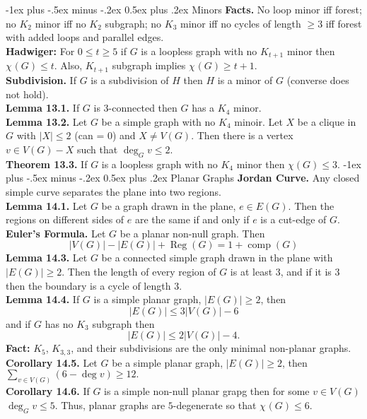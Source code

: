 \documentclass[10pt,landscape]{article}
\makeatletter
\renewcommand{\section}{\@startsection{section}{1}{0mm}%
                                {-1ex plus -.5ex minus -.2ex}%
                                {0.5ex plus .2ex}%
                                {\normalfont\large\bfseries}}
\makeatother
\begin{document}
\begin{multicols}{3}
\section{Minors}
\textbf{Facts.} No loop minor iff forest; no \( K_2 \) minor iff no \( K_2 \) subgraph; no \( K_3 \) minor iff no cycles of length \( \geq 3 \) iff forest with added loops and parallel edges. \\
\textbf{Hadwiger:} For \( 0 \leq t \geq 5 \) if \( G \) is a loopless graph with no \( K_{t+1}  \) minor then \( \chi_{} (G) \leq t \). Also, \( K_{t+1}  \) subgraph implies \( \chi_{} (G) \geq t + 1 \). \\
\textbf{Subdivision.} If \( G \) is a subdivision of \( H \) then \( H \) is a minor of \( G \) (converse does not hold). \\
\textbf{Lemma 13.1.} If \( G \) is 3-connected then \( G \) has a \( K_4 \) minor. \\
\textbf{Lemma 13.2.} Let \( G \) be a simple graph with no \( K_4 \) minoir. Let \( X \) be a clique in \( G \) with \( |X| \leq 2 \) (can = 0) and \( X \neq V(G) \). Then there is a vertex \( v \in V(G) - X \) such that \( \deg _{G} v \leq 2 \). \\
\textbf{Theorem 13.3.} If \( G \) is a loopless graph with no \( K_4 \) minor then \( \chi(G) \leq 3 \).
\section{Planar Graphs}
\textbf{Jordan Curve.} Any closed simple curve separates the plane into two regions. \\
\textbf{Lemma 14.1.} Let \( G \) be a graph drawn in the plane, \( e \in E(G) \). Then the regions on different sides of \( e \) are the same if and only if \( e \) is a cut-edge of \( G \). \\
\textbf{Euler's Formula.} Let \( G \) be a planar non-null graph. Then \[|V(G)| - |E(G)| + \operatorname{Reg}(G) = 1 + \operatorname{comp}(G) \] 
\textbf{Lemma 14.3.} Let \( G \) be a connected simple graph drawn in the plane with \( |E(G)| \geq 2 \). Then the length of every region of \( G \) is at least 3, and if it is 3 then the boundary is a cycle of length 3. \\
\textbf{Lemma 14.4.} If \( G \) is a simple planar graph, \( |E(G)| \geq 2 \), then \[|E(G)| \leq 3|V(G)| - 6\] and if \( G \) has no \( K_3 \) subgraph then \[|E(G)| \leq 2|V(G)| - 4.\]
\textbf{Fact:} \( K_5 \), \( K_{3,3}  \), and their subdivisions are the only minimal non-planar graphs. \\
\textbf{Corollary 14.5.} Let \( G \) be a simple planar graph, \( |E(G)| \geq 2 \), then \( \sum_{v \in V(G)}^{} (6 - \deg v)  \geq 12.\) \\
\textbf{Corollary 14.6.} If \( G \) is a simple non-null planar grapg then for some \( v \in V(G) \) \( \deg _{G} v \leq 5 \). Thus, planar graphs are \( 5 \)-degenerate so that \( \chi_{} (G) \leq 6 \).

\end{multicols}
\end{document}
